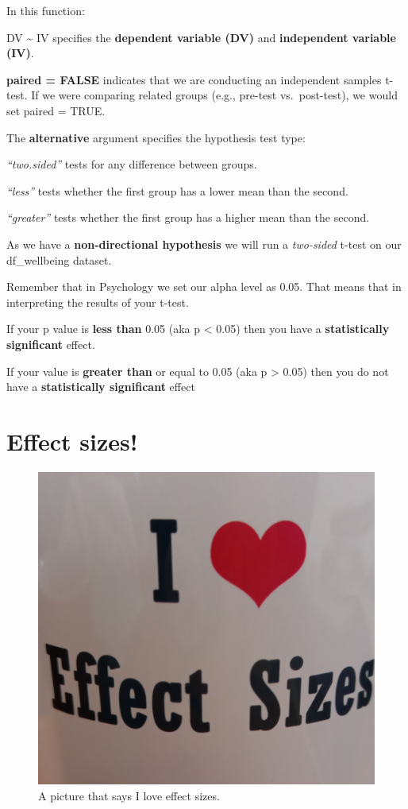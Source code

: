 \documentclass[
]{book}
\begin{document}
In this function:

DV \textasciitilde{} IV specifies the \textbf{dependent variable (DV)} and \textbf{independent variable (IV)}.

\textbf{paired = FALSE} indicates that we are conducting an independent samples t-test. If we were comparing related groups (e.g., pre-test vs.~post-test), we would set paired = TRUE.

The \textbf{alternative} argument specifies the hypothesis test type:

\emph{``two.sided''} tests for any difference between groups.

\emph{``less''} tests whether the first group has a lower mean than the second.

\emph{``greater''} tests whether the first group has a higher mean than the second.

As we have a \textbf{non-directional hypothesis} we will run a \emph{two-sided} t-test on our df\_wellbeing dataset.

Remember that in Psychology we set our alpha level as 0.05. That means that in interpreting the results of your t-test.

If your p value is \textbf{less than} 0.05 (aka p \textless{} 0.05) then you have a \textbf{statistically significant} effect.

If your value is \textbf{greater than} or equal to 0.05 (aka p \textgreater{} 0.05) then you do not have a \textbf{statistically significant} effect

\section{Effect sizes!}\label{effect-sizes}

\begin{figure}
\centering
\includegraphics{img/05-EffectSizes.jpg}
\caption{A picture that says I love effect sizes.}
\end{figure}
\end{document}
